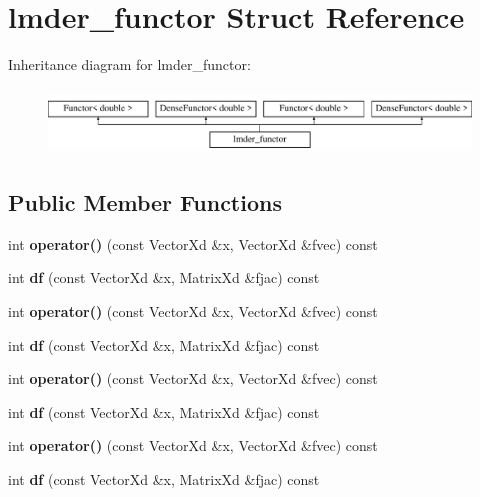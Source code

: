 \hypertarget{structlmder__functor}{}\section{lmder\+\_\+functor Struct Reference}
\label{structlmder__functor}
Inheritance diagram for lmder\+\_\+functor\+:\begin{figure}[H]
\begin{center}
\leavevmode
\includegraphics[height=1.728395cm]{structlmder__functor}
\end{center}
\end{figure}
\subsection*{Public Member Functions}
\begin{DoxyCompactItemize}
\item 
\mbox{\label{structlmder__functor_a6e5a476adf8de596023bbc60b38229a6}} 
int {\bfseries operator()} (const Vector\+Xd \&x, Vector\+Xd \&fvec) const
\item 
\mbox{\label{structlmder__functor_ad7a35ba10249b1c359c517cb15b3b83b}} 
int {\bfseries df} (const Vector\+Xd \&x, Matrix\+Xd \&fjac) const
\item 
\mbox{\label{structlmder__functor_a6e5a476adf8de596023bbc60b38229a6}} 
int {\bfseries operator()} (const Vector\+Xd \&x, Vector\+Xd \&fvec) const
\item 
\mbox{\label{structlmder__functor_ad7a35ba10249b1c359c517cb15b3b83b}} 
int {\bfseries df} (const Vector\+Xd \&x, Matrix\+Xd \&fjac) const
\item 
\mbox{\label{structlmder__functor_a6e5a476adf8de596023bbc60b38229a6}} 
int {\bfseries operator()} (const Vector\+Xd \&x, Vector\+Xd \&fvec) const
\item 
\mbox{\label{structlmder__functor_ad7a35ba10249b1c359c517cb15b3b83b}} 
int {\bfseries df} (const Vector\+Xd \&x, Matrix\+Xd \&fjac) const
\item 
\mbox{\label{structlmder__functor_a6e5a476adf8de596023bbc60b38229a6}} 
int {\bfseries operator()} (const Vector\+Xd \&x, Vector\+Xd \&fvec) const
\item 
\mbox{\label{structlmder__functor_ad7a35ba10249b1c359c517cb15b3b83b}} 
int {\bfseries df} (const Vector\+Xd \&x, Matrix\+Xd \&fjac) const
\end{DoxyCompactItemize}
